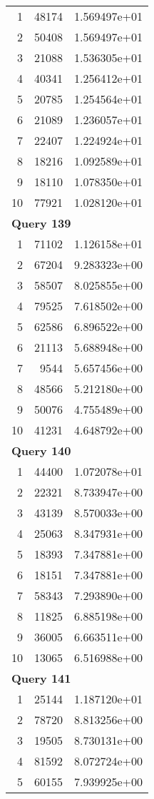 \begin{longtable}[{p}]{@{}rrp{}@{}}
1 & 48174 & 1.569497e+01 \\
2 & 50408 & 1.569497e+01 \\
3 & 21088 & 1.536305e+01 \\
4 & 40341 & 1.256412e+01 \\
5 & 20785 & 1.254564e+01 \\
6 & 21089 & 1.236057e+01 \\
7 & 22407 & 1.224924e+01 \\
8 & 18216 & 1.092589e+01 \\
9 & 18110 & 1.078350e+01 \\
10 & 77921 & 1.028120e+01 \\
\midrule
\multicolumn{3}{l}{\bfseries Query 139} \\
1 & 71102 & 1.126158e+01 \\
2 & 67204 & 9.283323e+00 \\
3 & 58507 & 8.025855e+00 \\
4 & 79525 & 7.618502e+00 \\
5 & 62586 & 6.896522e+00 \\
6 & 21113 & 5.688948e+00 \\
7 & 9544 & 5.657456e+00 \\
8 & 48566 & 5.212180e+00 \\
9 & 50076 & 4.755489e+00 \\
10 & 41231 & 4.648792e+00 \\
\midrule
\multicolumn{3}{l}{\bfseries Query 140} \\
1 & 44400 & 1.072078e+01 \\
2 & 22321 & 8.733947e+00 \\
3 & 43139 & 8.570033e+00 \\
4 & 25063 & 8.347931e+00 \\
5 & 18393 & 7.347881e+00 \\
6 & 18151 & 7.347881e+00 \\
7 & 58343 & 7.293890e+00 \\
8 & 11825 & 6.885198e+00 \\
9 & 36005 & 6.663511e+00 \\
10 & 13065 & 6.516988e+00 \\
\midrule
\multicolumn{3}{l}{\bfseries Query 141} \\
1 & 25144 & 1.187120e+01 \\
2 & 78720 & 8.813256e+00 \\
3 & 19505 & 8.730131e+00 \\
4 & 81592 & 8.072724e+00 \\
5 & 60155 & 7.939925e+00 \\

\end{longtable}
